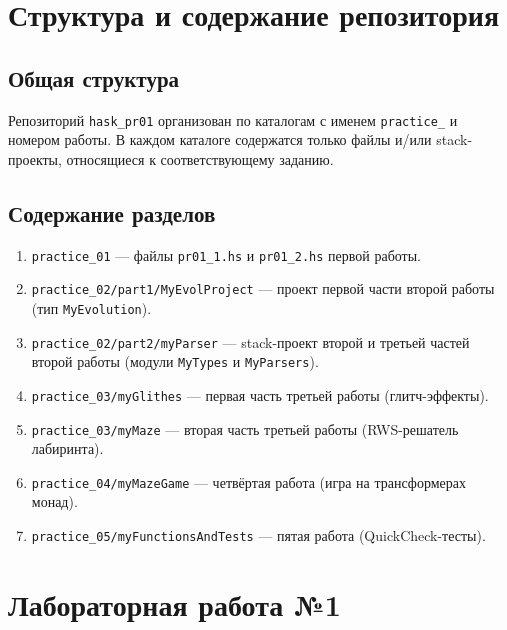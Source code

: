 \documentclass[a4paper, final]{article}
\begin{document}
\section{Структура и содержание репозитория}

\subsection{Общая структура}

Репозиторий \texttt{hask\_pr01} организован по каталогам с именем
\texttt{practice\_} и номером работы. В каждом каталоге содержатся только
файлы и/или stack-проекты, относящиеся к соответствующему заданию.

\subsection{Содержание разделов}

\begin{enumerate}[leftmargin=*]
  \item \texttt{practice\_01} — файлы \texttt{pr01\_1.hs} и \texttt{pr01\_2.hs}
        первой работы.
  \item \texttt{practice\_02/part1/MyEvolProject} — проект первой части
        второй работы (тип \texttt{MyEvolution}).
  \item \texttt{practice\_02/part2/myParser} — stack-проект второй и третьей
        частей второй работы (модули \texttt{MyTypes} и \texttt{MyParsers}).
  \item \texttt{practice\_03/myGlithes} — первая часть третьей работы
        (глитч-эффекты).
  \item \texttt{practice\_03/myMaze} — вторая часть третьей работы
        (RWS-решатель лабиринта).
  \item \texttt{practice\_04/myMazeGame} — четвёртая работа (игра на
        трансформерах монад).
  \item \texttt{practice\_05/myFunctionsAndTests} — пятая работа
        (QuickCheck-тесты).
\end{enumerate}

\section{Лабораторная работа №1}
\end{document}
